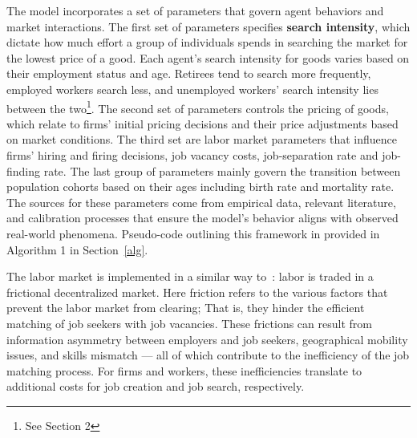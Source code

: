 \documentclass[ %
    final,
    scrbook,
    listoffigures,
    listoftables, 
    glossary]{cu-thesis}
\begin{document}
The model incorporates a set of parameters that govern agent behaviors and market interactions. The first set of parameters specifies {\bf search intensity}, which dictate how much effort a group of individuals spends in searching the market for the lowest price of a good.  
Each agent's search intensity for goods varies based on their employment status and age. 
Retirees tend to search more frequently, employed workers search less, and unemployed workers' search intensity lies between the two\footnote{See Section 2}. The second set of parameters controls the pricing of goods, which relate to firms' initial pricing decisions and their price adjustments based on market conditions. The third set are labor market parameters that influence firms' hiring and firing decisions, job vacancy costs, job-separation rate and job-finding rate. The last group of parameters mainly govern the transition between population cohorts based on their ages including birth rate and mortality rate. The sources for these parameters come from empirical data, relevant literature, and calibration processes that ensure the model's behavior aligns with observed real-world phenomena. Pseudo-code outlining this framework in provided in Algorithm 1 in Section~\ref{alg}.

The labor market is implemented in a similar way to~\cite{pissarides2000equilibrium}: labor is traded in a frictional decentralized market. Here friction refers to the various factors that prevent the labor market from clearing; That is, they hinder the efficient matching of job seekers with job vacancies. These frictions can result from information asymmetry between employers and job seekers, geographical mobility issues, and skills mismatch --- all of which contribute to the inefficiency of the job matching process. 
For firms and workers, these inefficiencies translate to additional costs for job creation and job search, respectively.
\end{document}
